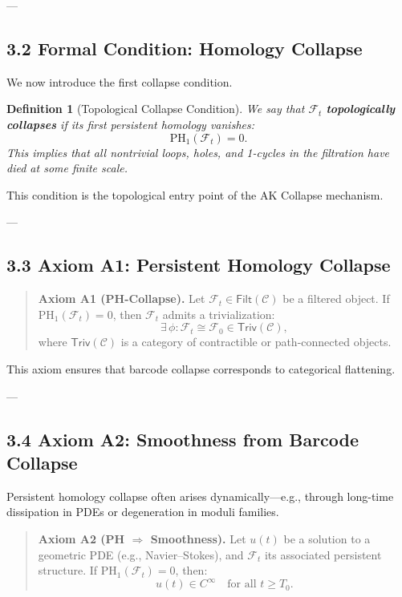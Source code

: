 \documentclass[11pt]{article}
\newtheorem{definition}[theorem]{Definition}
\begin{document}
---

\subsection*{3.2 Formal Condition: Homology Collapse}

We now introduce the first collapse condition.

\begin{definition}[Topological Collapse Condition]
We say that \( \mathcal{F}_t \) \textbf{topologically collapses} if its first persistent homology vanishes:
\[
\mathrm{PH}_1(\mathcal{F}_t) = 0.
\]
This implies that all nontrivial loops, holes, and 1-cycles in the filtration have died at some finite scale.
\end{definition}

This condition is the topological entry point of the AK Collapse mechanism.

---

\subsection*{3.3 Axiom A1: Persistent Homology Collapse}

\begin{quote}
\textbf{Axiom A1 (PH-Collapse).}  
Let \( \mathcal{F}_t \in \mathsf{Filt}(\mathcal{C}) \) be a filtered object.  
If \( \mathrm{PH}_1(\mathcal{F}_t) = 0 \), then \( \mathcal{F}_t \) admits a trivialization:
\[
\exists \, \phi: \mathcal{F}_t \cong \mathcal{F}_0 \in \mathsf{Triv}(\mathcal{C}),
\]
where \( \mathsf{Triv}(\mathcal{C}) \) is a category of contractible or path-connected objects.
\end{quote}

This axiom ensures that barcode collapse corresponds to categorical flattening.

---

\subsection*{3.4 Axiom A2: Smoothness from Barcode Collapse}

Persistent homology collapse often arises dynamically—e.g., through long-time dissipation in PDEs or degeneration in moduli families.

\begin{quote}
\textbf{Axiom A2 (PH $\Rightarrow$ Smoothness).}  
Let \( u(t) \) be a solution to a geometric PDE (e.g., Navier–Stokes), and \( \mathcal{F}_t \) its associated persistent structure.  
If \( \mathrm{PH}_1(\mathcal{F}_t) = 0 \), then:
\[
u(t) \in C^\infty \quad \text{for all } t \geq T_0.
\]
\end{quote}
\end{document}

